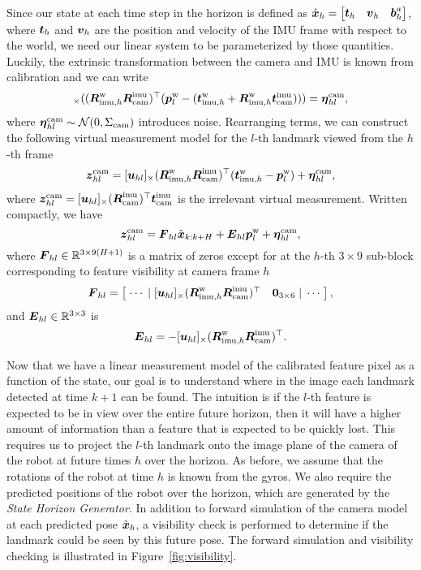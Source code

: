 Since our state at each time step in the horizon is defined as $\hat{\boldsymbol x}_h=\begin{bmatrix}\boldsymbol t_h&\boldsymbol v_h&\boldsymbol b^a_h\end{bmatrix}$, where $\boldsymbol t_h$ and $\boldsymbol v_h$ are the position and velocity of the IMU frame with respect to the world, we need our linear system to be parameterized by those quantities.
Luckily, the extrinsic transformation between the camera and IMU is known from calibration and we can write
\begin{equation*}
[\uhl]_\times((\RWIh\RIC)^\top(\pWL-(\tWIh+\RWIh\tIC))) = \nhl,
\end{equation*}
where $\boldsymbol \eta_{hl}^\text{cam}\sim\mathcal{N}(0,\Sigma_\text{cam})$ introduces noise.
Rearranging terms, we can construct the following virtual measurement model for the $l$-th landmark viewed from the $h$-th frame
\begin{equation*}
\boldsymbol z_{hl}^\text{cam} = [\boldsymbol u_{hl}]_\times(\boldsymbol R^\text{w}_{\text{imu},h}\boldsymbol R^\text{imu}_\text{cam})^\top(\boldsymbol t^\text{w}_{\text{imu},h}-\boldsymbol p^\text{w}_l) + \boldsymbol \eta_{hl}^\text{cam},
\end{equation*}
where $\boldsymbol z_{hl}^\text{cam}=[\boldsymbol u_{hl}]_\times(\boldsymbol R^\text{imu}_\text{cam})^\top\boldsymbol t^\text{imu}_\text{cam}$ is the irrelevant virtual measurement.
Written compactly, we have
\begin{equation}\label{eqn:vision-model}
\boldsymbol z_{hl}^\text{cam} = \boldsymbol F_{hl}\hat{\boldsymbol x}_{k:k+H} + \boldsymbol E_{hl}\boldsymbol p^\text{w}_l + \boldsymbol \eta_{hl}^\text{cam},
\end{equation}
where $\boldsymbol F_{hl}\in\mathbb{R}^{3\times 9(H+1)}$ is a matrix of zeros except for at the $h$-th $3\times 9$ sub-block corresponding to feature visibility at camera frame $h$
\begin{equation*}
\boldsymbol F_{hl} =
\begin{bmatrix}
\;\cdots\;|\;[\boldsymbol u_{hl}]_\times(\boldsymbol R^\text{w}_{\text{imu},h}\boldsymbol R^\text{imu}_\text{cam})^\top & \boldsymbol 0_{3\times 6}\;|\;\cdots\;
\end{bmatrix},
\end{equation*}
and $\boldsymbol E_{hl}\in\mathbb{R}^{3\times 3}$ is
\begin{equation*}
\boldsymbol E_{hl} = -[\boldsymbol u_{hl}]_\times(\boldsymbol R^\text{w}_{\text{imu},h}\boldsymbol R^\text{imu}_\text{cam})^\top.
\end{equation*}

Now that we have a linear measurement model of the calibrated feature pixel as a function of the state, our goal is to understand where in the image each landmark detected at time $k+1$ can be found.
The intuition is if the $l$-th feature is expected to be in view over the entire future horizon, then it will have a higher amount of information than a feature that is expected to be quickly lost.
This requires us to project the $l$-th landmark onto the image plane of the camera of the robot at future times $h$ over the horizon.
As before, we assume that the rotations of the robot at time $h$ is known from the gyros.
We also require the predicted positions of the robot over the horizon, which are generated by the \emph{State Horizon Generator}.
In addition to forward simulation of the camera model at each predicted pose $\hat{\boldsymbol x}_h$, a visibility check is performed to determine if the landmark could be seen by this future pose.
The forward simulation and visibility checking is illustrated in Figure~\ref{fig:visibility}.

